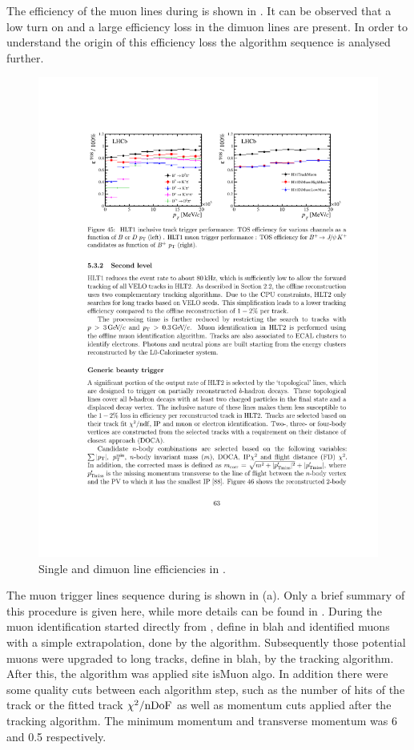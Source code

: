 The efficiency of the muon lines during \runone is shown in .
It can be observed that a low \pt turn on and a large efficiency loss in the dimuon lines are present.
In order to understand the origin of this efficiency loss the \hltone algorithm sequence is analysed further.


\begin{figure}[h!]
  \centering
  \includegraphics[trim=11cm 20.5cm 2cm 3cm, clip=true,scale=1.]{Figures/Chapter3/hlt1_muon_eff_run1.pdf}
  \caption{ Single and dimuon \hltone line efficiencies in \runone \cite{LHCb-PROC-2014-005}. }
  \label{fig:hlt1_eff_run1}
\end{figure}


The \hltone muon trigger lines sequence during \runone is shown in (a).
Only a brief summary of this procedure is given here,  while more details can be found in \cite{LHCb-PUB-2011-017}.
During \runone the muon identification started directly from \veloTracks,{\color{red} define in blah}
and identified muons with a simple extrapolation, done by the \mvm algorithm\cite{LHCb-PUB-2011-017}.
Subsequently those potential muons were upgraded to long tracks, {\color{red} define in blah}, by the
\FwD tracking algorithm. After this, the \isMuon algorithm was applied {\color{red} site isMuon algo}.
In addition there were some quality cuts between each algorithm step, such as the number of \velo hits
of the track or the fitted track $\chi^2/{\rm nDoF}$ as well as momentum cuts applied after the \FwD
tracking algorithm. The minimum momentum and transverse momentum was 6 \gevc and 0.5 \gevc respectively.

